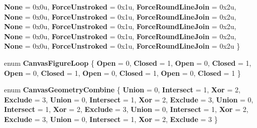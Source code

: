 \begin{DoxyCompactItemize}
{\bfseries None} = 0x0u, 
{\bfseries Force\+Unstroked} = 0x1u, 
{\bfseries Force\+Round\+Line\+Join} = 0x2u, 
{\bfseries None} = 0x0u, 
\newline
{\bfseries Force\+Unstroked} = 0x1u, 
{\bfseries Force\+Round\+Line\+Join} = 0x2u, 
{\bfseries None} = 0x0u, 
{\bfseries Force\+Unstroked} = 0x1u, 
\newline
{\bfseries Force\+Round\+Line\+Join} = 0x2u, 
{\bfseries None} = 0x0u, 
{\bfseries Force\+Unstroked} = 0x1u, 
{\bfseries Force\+Round\+Line\+Join} = 0x2u, 
\newline
{\bfseries None} = 0x0u, 
{\bfseries Force\+Unstroked} = 0x1u, 
{\bfseries Force\+Round\+Line\+Join} = 0x2u
 \}
\item 
\mbox{\label{namespace_microsoft_1_1_graphics_1_1_canvas_1_1_geometry_a28bf1d65eb419d2a2015efc91bb9741c}} 
enum {\bfseries Canvas\+Figure\+Loop} \{ \newline
{\bfseries Open} = 0, 
{\bfseries Closed} = 1, 
{\bfseries Open} = 0, 
{\bfseries Closed} = 1, 
\newline
{\bfseries Open} = 0, 
{\bfseries Closed} = 1, 
{\bfseries Open} = 0, 
{\bfseries Closed} = 1, 
\newline
{\bfseries Open} = 0, 
{\bfseries Closed} = 1
 \}
\item 
\mbox{\label{namespace_microsoft_1_1_graphics_1_1_canvas_1_1_geometry_a8aee93f6169d213f64028a369522c8bb}} 
enum {\bfseries Canvas\+Geometry\+Combine} \{ \newline
{\bfseries Union} = 0, 
{\bfseries Intersect} = 1, 
{\bfseries Xor} = 2, 
{\bfseries Exclude} = 3, 
\newline
{\bfseries Union} = 0, 
{\bfseries Intersect} = 1, 
{\bfseries Xor} = 2, 
{\bfseries Exclude} = 3, 
\newline
{\bfseries Union} = 0, 
{\bfseries Intersect} = 1, 
{\bfseries Xor} = 2, 
{\bfseries Exclude} = 3, 
\newline
{\bfseries Union} = 0, 
{\bfseries Intersect} = 1, 
{\bfseries Xor} = 2, 
{\bfseries Exclude} = 3, 
\newline
{\bfseries Union} = 0, 
{\bfseries Intersect} = 1, 
{\bfseries Xor} = 2, 
{\bfseries Exclude} = 3
 \}
\item 
\mbox{\label{namespace_microsoft_1_1_graphics_1_1_canvas_1_1_geometry_a2ce59b66d6d8d5be54c22ba03d885c82}} 

\end{DoxyCompactItemize}
